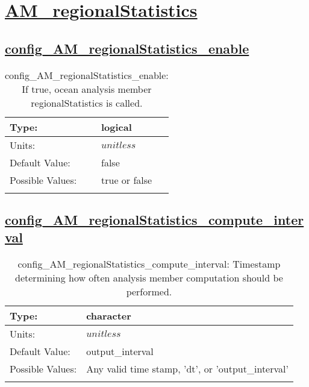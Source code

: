 \section[AM\_regionalStatistics]{\hyperref[sec:nm_tab_AM_regionalStatistics]{AM\_regionalStatistics}}
\label{sec:nm_sec_AM_regionalStatistics}
\subsection[config\_AM\_regionalStatistics\_enable]{\hyperref[sec:nm_tab_AM_regionalStatistics]{config\_AM\_regionalStatistics\_enable}}
\label{subsec:nm_sec_config_AM_regionalStatistics_enable}
\begin{center}
\begin{longtable}{| p{2.0in} || p{4.0in} |}
    \hline
    Type: & logical \\
    \hline
    Units: & $unitless$ \\
    \hline
    Default Value: & false \\
    \hline
    Possible Values: & true or false \\
    \hline
    \caption{config\_AM\_regionalStatistics\_enable: If true, ocean analysis member regionalStatistics is called.}
\end{longtable}
\end{center}
\subsection[config\_AM\_regionalStatistics\_compute\_interval]{\hyperref[sec:nm_tab_AM_regionalStatistics]{config\_AM\_regionalStatistics\_compute\_interval}}
\label{subsec:nm_sec_config_AM_regionalStatistics_compute_interval}
\begin{center}
\begin{longtable}{| p{2.0in} || p{4.0in} |}
    \hline
    Type: & character \\
    \hline
    Units: & $unitless$ \\
    \hline
    Default Value: & output\_interval \\
    \hline
    Possible Values: & Any valid time stamp, 'dt', or 'output\_interval' \\
    \hline
    \caption{config\_AM\_regionalStatistics\_compute\_interval: Timestamp determining how often analysis member computation should be performed.}
\end{longtable}
\end{center}
